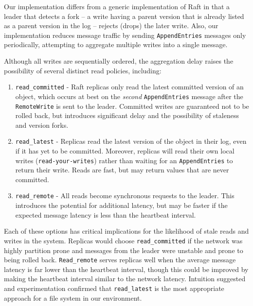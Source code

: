 \documentclass[10pt,conference,letterpaper]{IEEEtran}
\newcommand{\todo}[1]{{\textcolor{red}{#1}}}
\newcommand{\pjk}[1]{[\todo{PJK: #1}]}
\begin{document}
Our implementation differs from a generic implementation of Raft in that
a leader that detects a
fork -- a write having a parent version that is already listed as a parent version in the
log -- rejects (drops) the later write.
Also, our implementation reduces message traffic by sending \texttt{AppendEntries}
messages only periodically, attempting to aggregate multiple writes into a single
message.



Although all writes are sequentially ordered, the aggregation delay raises the possibility
of several distinct read policies, including:
\begin{enumerate}
    \item \texttt{read\_committed} - Raft replicas only read the latest committed version
of an object, which occurs at best on the \emph{second} \texttt{AppendEntries} message
after the \texttt{RemoteWrite} is sent to the leader. Committed writes are guaranteed not
to be rolled back, but introduces significant delay and the possibility of staleness and
version forks.
    \item \texttt{read\_latest} - Replicas read the latest version of the object
in their log, even if it has yet to be committed.
Moreover, replicas will read their own local writes (\texttt{read-your-writes}) rather than waiting for an
\texttt{AppendEntries} to return their write. Reads are fast, but may return values that
are never committed.
    \item \texttt{read\_remote} - All reads become synchronous requests to the leader.
This introduces the potential for additional latency, but may be faster if the expected
message latency is less than the heartbeat interval.
\end{enumerate}

Each of these options has critical implications for the likelihood of stale reads and
writes in the system.
Replicas would choose \texttt{read\_committed} if the network was highly partition prone and
messages from the leader were unstable and prone to being rolled back.
\texttt{Read\_remote} serves replicas well when the average message latency is far lower than the
heartbeat interval, though this could be improved by making the heartbeat interval similar
to the network latency.
Intuition suggested and experimentation confirmed that \texttt{read\_latest}
is the most appropriate approach for a file
system in our environment.
\end{document}
